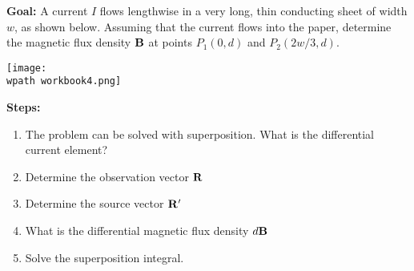 \documentclass[../../header.tex]{subfiles}
\begin{document}
\textbf{Goal:} A current $I$ flows lengthwise in a very long, thin conducting sheet of width $w$, as shown below. Assuming that the current flows into the paper, determine the magnetic flux density $\mathbf{B}$ at points $P_1(0,d)$ and $P_2(2w/3,d)$.
\begin{center}
\texttt{[image: \\wpath workbook4.png]}
\end{center}
\textbf{Steps:} 
\begin{enumerate}

\item The problem can be solved with superposition. What is the differential current element? \\

\item Determine the observation vector $\mathbf{R}$\\

\item Determine the source vector $\mathbf{R}'$\\

\item What is the differential magnetic flux density $d\mathbf{B}$\\

\item Solve the superposition integral.\\


\end{enumerate}
\end{document}
